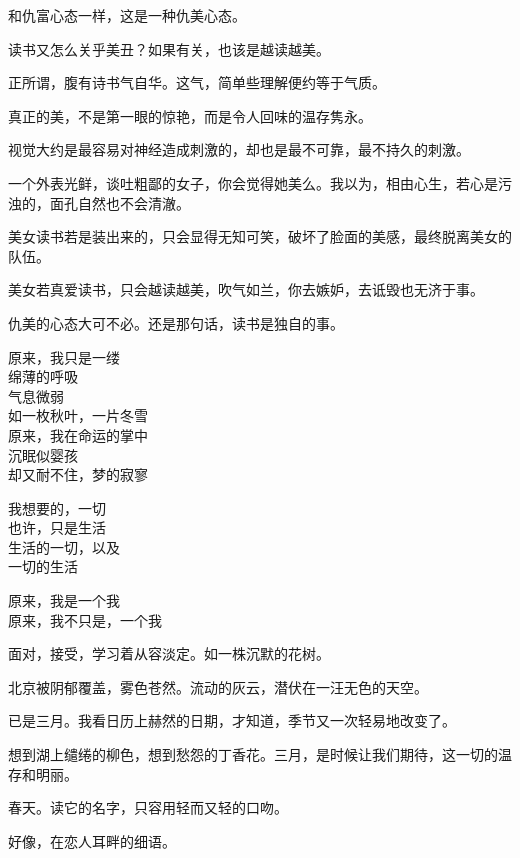 \documentclass[12pt,a4paper]{article}
\def\blankrev{\vspace{1ex}}									%
\begin{document}
		和仇富心态一样，这是一种仇美心态。\par
		读书又怎么关乎美丑？如果有关，也该是越读越美。\par
		正所谓，腹有诗书气自华。这气，简单些理解便约等于气质。\par
		真正的美，不是第一眼的惊艳，而是令人回味的温存隽永。\par
		视觉大约是最容易对神经造成刺激的，却也是最不可靠，最不持久的刺激。\par
		一个外表光鲜，谈吐粗鄙的女子，你会觉得她美么。我以为，相由心生，若心是污浊的，面孔自然也不会清澈。\par
		美女读书若是装出来的，只会显得无知可笑，破坏了脸面的美感，最终脱离美女的队伍。\par
		美女若真爱读书，只会越读越美，吹气如兰，你去嫉妒，去诋毁也无济于事。\par
		仇美的心态大可不必。还是那句话，读书是独自的事。

	\endwriting



		\longpoem{}{}{}
		原来，我只是一缕 \\
		绵薄的呼吸 \\
		气息微弱 \\
		如一枚秋叶，一片冬雪 \\
		原来，我在命运的掌中 \\
		沉眠似婴孩 \\
		却又耐不住，梦的寂寥

		我想要的，一切 \\
		也许，只是生活 \\
		生活的一切，以及 \\
		一切的生活

		原来，我是一个我 \\
		原来，我不只是，一个我
		\endlongpoem

	\endwriting



		面对，接受，学习着从容淡定。如一株沉默的花树。

		\blankrev
		北京被阴郁覆盖，雾色苍然。流动的灰云，潜伏在一汪无色的天空。\par
		已是三月。我看日历上赫然的日期，才知道，季节又一次轻易地改变了。\par
		想到湖上缱绻的柳色，想到愁怨的丁香花。三月，是时候让我们期待，这一切的温存和明丽。\par
		春天。读它的名字，只容用轻而又轻的口吻。\par
		好像，在恋人耳畔的细语。
\end{document}
